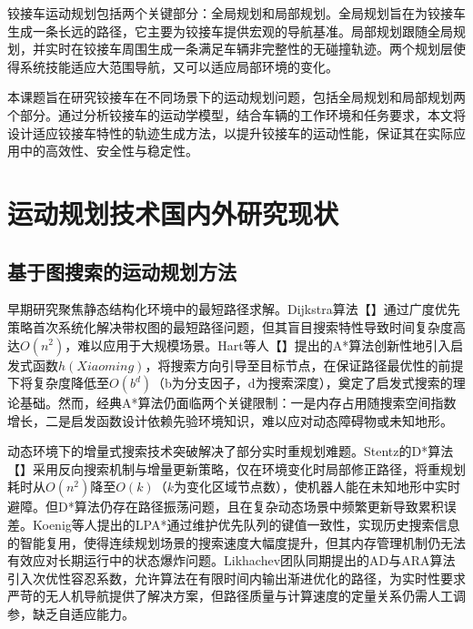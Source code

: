 \documentclass[master,academic]{ysuthesis} %
\begin{document}
	铰接车运动规划包括两个关键部分：全局规划和局部规划。全局规划旨在为铰接车生成一条长远的路径，它主要为铰接车提供宏观的导航基准。局部规划跟随全局规划，并实时在铰接车周围生成一条满足车辆非完整性的无碰撞轨迹。两个规划层使得系统技能适应大范围导航，又可以适应局部环境的变化。

	本课题旨在研究铰接车在不同场景下的运动规划问题，包括全局规划和局部规划两个部分。通过分析铰接车的运动学模型，结合车辆的工作环境和任务要求，本文将设计适应铰接车特性的轨迹生成方法，以提升铰接车的运动性能，保证其在实际应用中的高效性、安全性与稳定性。
	\section{运动规划技术国内外研究现状}
		\subsection{基于图搜索的运动规划方法}
		早期研究聚焦静态结构化环境中的最短路径求解。Dijkstra算法【】通过广度优先策略首次系统化解决带权图的最短路径问题，但其盲目搜索特性导致时间复杂度高达$O(n^2)$，难以应用于大规模场景。Hart等人【】提出的A*算法创新性地引入启发式函数$h(Xiaoming)$，将搜索方向引导至目标节点，在保证路径最优性的前提下将复杂度降低至$O(b^d)$（b为分支因子，d为搜索深度），奠定了启发式搜索的理论基础。然而，经典A*算法仍面临两个关键限制：一是内存占用随搜索空间指数增长，二是启发函数设计依赖先验环境知识，难以应对动态障碍物或未知地形。

		动态环境下的增量式搜索技术突破解决了部分实时重规划难题。Stentz的D*算法【】采用反向搜索机制与增量更新策略，仅在环境变化时局部修正路径，将重规划耗时从$O(n^2)$降至$O(k)$（$k$为变化区域节点数），使机器人能在未知地形中实时避障。但D*算法仍存在路径振荡问题，且在复杂动态场景中频繁更新导致累积误差。Koenig等人提出的LPA*通过维护优先队列的键值一致性，实现历史搜索信息的智能复用，使得连续规划场景的搜索速度大幅度提升，但其内存管理机制仍无法有效应对长期运行中的状态爆炸问题。Likhachev团队同期提出的AD与ARA算法引入次优性容忍系数，允许算法在有限时间内输出渐进优化的路径，为实时性要求严苛的无人机导航提供了解决方案，但路径质量与计算速度的定量关系仍需人工调参，缺乏自适应能力。
\end{document}
